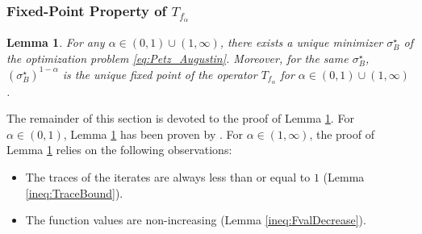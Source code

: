 \documentclass{article}
\newtheorem{lemma}[theorem]{Lemma}
\newtheorem{corollary}[theorem]{Corollary}
\begin{document}
\subsubsection{Fixed-Point Property of $T_{f_{\alpha}}$}
\label{subsec:FixPt}
\begin{lemma}
    \label{eq:FixPtIsMin}
    For any $\alpha  \in (0, 1) \cup (1, \infty)$, there exists a unique minimizer $\sigma_B^{\star}$ of the optimization problem \eqref{eq:Petz_Augustin}.
    Moreover, for the same $\sigma_B^{\star}$, $\left(\sigma_B^{\star}\right)^{1-\alpha}$ is the unique fixed point of the operator $T_{f_{\alpha}}$ for $\alpha\in(0,1)\cup(1,\infty)$.
\end{lemma}
The remainder of this section is devoted to the proof of Lemma \ref{eq:FixPtIsMin}.
For $\alpha\in(0,1)$, Lemma \ref{eq:FixPtIsMin} has been 
proven 
by \citet[Proposition 2(b)]{Cheng2019}.
For $\alpha\in(1,\infty)$, the proof of Lemma \ref{eq:FixPtIsMin} relies on the following observations:
\begin{itemize}
    \item The traces of the iterates are always less than or equal to $1$ (Lemma \ref{ineq:TraceBound}).
    \item The function values are non-increasing (Lemma \ref{ineq:FvalDecrease}).
\end{itemize}
\end{document}
